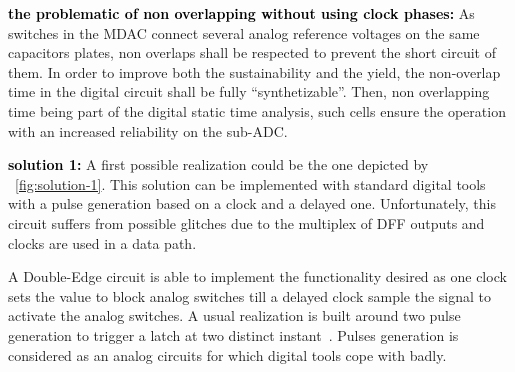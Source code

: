 \textbf{\textcolor{black}{the problematic of non overlapping without using clock phases:}}
As switches in the MDAC connect several analog reference voltages on the same capacitors plates, non overlaps shall be respected to prevent the short circuit of them. In order to improve both the sustainability and the yield, the non-overlap time in the digital circuit shall be fully ``synthetizable''. Then, non overlapping time being part of the digital static time analysis, such cells ensure the operation with an increased reliability on the sub-ADC\@.

\textbf{\textcolor{black}{solution 1:}}
A first possible realization could be the one depicted by \figurename~\ref{fig:solution-1}. This solution can be implemented with standard digital tools with a pulse generation based on a clock and a delayed one. Unfortunately, this circuit suffers from possible glitches due to the multiplex of DFF outputs and clocks are used in a data path.

A Double-Edge circuit is able to implement the functionality desired as one clock sets the value to block analog switches till a delayed clock sample the signal to activate the analog switches. A usual realization is built around two pulse generation to trigger a latch at two distinct instant~\cite{Afghahi1996, Cheng2003dig, Murotiya2013, Bonetti2015}. Pulses generation is considered as an analog circuits for which digital tools cope with badly.

